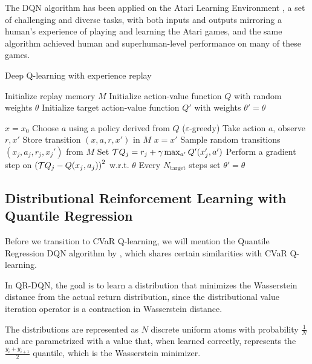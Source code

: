 The DQN algorithm has been applied on the Atari Learning Environment \citep{bellemare13arcade}, a set of challenging and diverse tasks, with both inputs and outputs mirroring a human's experience of playing and learning the Atari games, and the same algorithm achieved human and superhuman-level performance on many of these games.

\begin{algorithm}
\caption{Deep Q-learning with experience replay}
\begin{algorithmic}\label{alg:dqn}

    \STATE Initialize replay memory $M$
    \STATE Initialize action-value function $Q$ with random weights $\theta$
    \STATE Initialize target action-value function $Q'$ with weights $\theta'=\theta$

    \STATE $x=x_0$
	\STATE Choose $a$ using a policy derived from $Q$ ($\varepsilon$-greedy)
	\STATE Take action $a$, observe $r, x'$
	\STATE Store transition $(x, a, r, x')$ in $M$
	\STATE $x = x'$
	\STATE Sample random transitions $(x_j, a_j, r_j, x_j')$ from $M$
	\STATE Set $\mathcal{T} Q_j=r_j + \gamma \max_{a'} Q'(x_j', a')$
    \STATE Perform a gradient step on $\left( {\mathcal{T} Q_j - Q(x_j, a_j)} \right)^2$ w.r.t. $\theta$
    \STATE Every $N_\text{target}$ steps set $\theta'=\theta$
	\ENDWHILE
	\ENDFOR
	
\end{algorithmic}
\end{algorithm}

\subsection{Distributional Reinforcement Learning with Quantile Regression}\label{sec:dqn:qrdqn}
Before we transition to CVaR Q-learning, we will mention the Quantile Regression DQN algorithm by \citet{dabney2017distributional}, which shares certain similarities with CVaR Q-learning.

In QR-DQN, the goal is to learn a distribution that minimizes the Wasserstein distance from the actual return distribution, since the distributional value iteration operator is a contraction in Wasserstein distance. 

The distributions are represented as $N$ discrete uniform atoms with probability $\frac{1}{N}$ and are parametrized with a value that, when learned correctly, represents the $\frac{y_{i}+y_{i+1}}{2}$ quantile, which is the Wasserstein minimizer.

